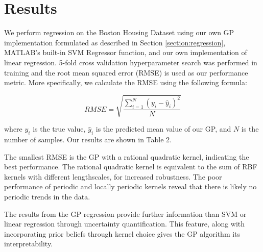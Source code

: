 \documentclass{article}
\begin{document}
\section{Results}

We perform regression on the Boston Housing Dataset using our own GP implementation formulated as described in Section
\ref{section:regression}, MATLAB's built-in SVM Regressor function, and our own implementation of linear regression.
5-fold cross validation hyperparameter search was performed in training and the root mean squared error (RMSE) is used
as our performance metric. More specifically, we calculate the RMSE using the following formula:

\[
  RMSE = \sqrt{\frac{\sum\limits_{i=1}^{N} (y_i - \hat y_i)^{2}}{N}}
\]

where $y_i$ is the true value, $\hat y_i$ is the predicted mean value of our GP, and $N$ is the number of samples. Our
results are shown in Table 2.

The smallest RMSE is the GP with a rational quadratic kernel, indicating the best performance. The rational quadratic
kernel is equivalent to the sum of RBF kernels with different lengthscales, for increased robustness. The poor
performance of periodic and locally periodic kernels reveal that there is likely no periodic trends in the data.

The results from the GP regression provide further information than SVM or linear regression through uncertainty
quantification. This feature, along with incorporating prior beliefs through kernel choice gives the GP algorithm its
interpretability.

\begin{table}[H]\label{table:results}
\caption{Table of Boston Housing Dataset feature names and features}
\end{table}
\end{document}
